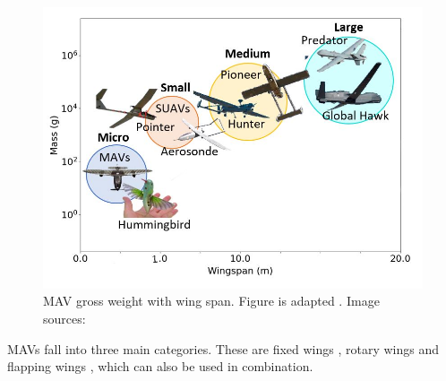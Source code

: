 \begin{figure}[H]
  \centering
   \includegraphics[width=\linewidth]{01_Introduction/Figs/replacement.JPG}
  \caption{MAV gross weight with wing span. Figure is adapted \cite{uavsize}. Image sources: \cite{MAVImage, Hummingbird, Ava, Aerosonde, hunter, pioneer, MQ9, hawk}}
  \label{fig:sizes}
\end{figure}


MAVs fall into three main categories. These are fixed wings \cite{Stanford2008}, rotary wings \cite{Lasek2001} and flapping wings \cite{Platzer2012}, which can also be used in combination.







